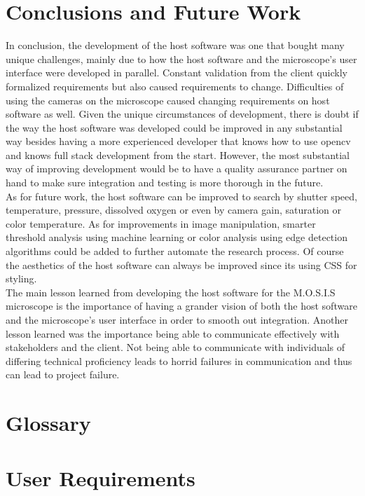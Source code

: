 \documentclass[12pt]{article}
\begin{document}
\section{Conclusions and Future Work}
In conclusion, the development of the host software was one that bought many unique challenges, mainly due to how the host software and the microscope's user interface were developed in parallel. Constant validation from the client quickly formalized requirements but also caused requirements to change. Difficulties of using the cameras on the microscope caused changing requirements on host software as well. Given the unique circumstances of development, there is doubt if the way the host software was developed could be improved in any substantial way besides having a more experienced developer that knows how to use opencv and knows full stack development from the start. However, the most substantial way of improving development would be to have a quality assurance partner on hand to make sure integration and testing is more thorough in the future.\\
As for future work, the host software can be improved to search by shutter speed, temperature, pressure, dissolved oxygen or even by camera gain, saturation or color temperature. As for improvements in image manipulation, smarter threshold analysis using machine learning or color analysis using edge detection algorithms could be added to further automate the research process. Of course the aesthetics of the host software can always be improved since its using CSS for styling.\\
The main lesson learned from developing the host software for the M.O.S.I.S microscope is the importance of having a grander vision of both the host software and the microscope's user interface in order to smooth out integration. Another lesson learned was the importance being able to communicate effectively with stakeholders and the client. Not being able to communicate with individuals of differing technical proficiency leads to horrid failures in communication and thus can lead to project failure.


\appendix
{}
\section{Glossary}
\section{User Requirements}
\end{document}
